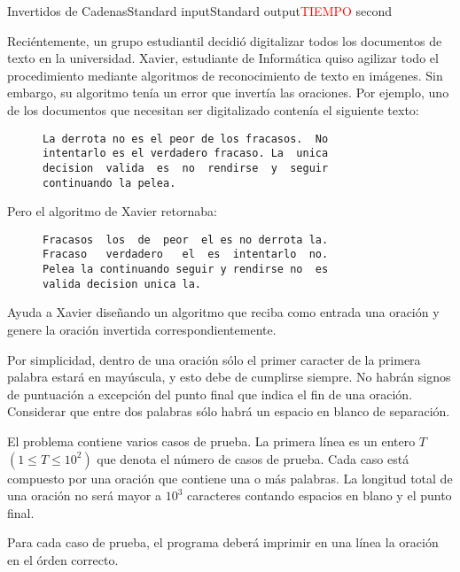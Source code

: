 \begin{problem}{Invertidos de Cadenas}{Standard input}{Standard output}{\textcolor{red}{TIEMPO} second}{}


Reciéntemente, un grupo estudiantil decidió digitalizar todos los documentos de texto en la universidad. Xavier, estudiante de Informática quiso agilizar todo el procedimiento mediante algoritmos de reconocimiento de texto en imágenes. Sin embargo, su algoritmo tenía un error que invertía las oraciones. Por ejemplo, uno de los documentos que necesitan ser digitalizado contenía el siguiente texto:

\begin{figure}[htb]
\centering
\begin{BVerbatim}
La derrota no es el peor de los fracasos.  No
intentarlo es el verdadero fracaso. La  unica 
decision  valida  es  no  rendirse  y  seguir
continuando la pelea.
\end{BVerbatim}
\end{figure}

Pero el algoritmo de Xavier retornaba:

\begin{figure}[htb]
\centering
\begin{BVerbatim}
Fracasos  los  de  peor  el es no derrota la.
Fracaso   verdadero   el  es  intentarlo  no.
Pelea la continuando seguir y rendirse no  es
valida decision unica la.
\end{BVerbatim}
\end{figure}

Ayuda a Xavier diseñando un algoritmo que reciba como entrada una oración y genere la oración invertida correspondientemente.

Por simplicidad, dentro de una oración sólo el primer caracter de la primera palabra estará en mayúscula, y esto debe de cumplirse siempre. No habrán signos de puntuación a excepción del punto final que indica el fin de una oración. Considerar que entre dos palabras sólo habrá un espacio en blanco de separación.


\InputFile
El problema contiene varios casos de prueba. La primera l\'inea es un entero $T$ $(1\leq T \leq 10^2)$ que denota el número de casos de prueba. Cada caso está compuesto por una oración que contiene una o más palabras. La longitud total de una oración no será mayor a $10^3$ caracteres contando espacios en blano y el punto final.

\OutputFile
Para cada caso de prueba, el programa deberá imprimir en una línea la oración en el órden correcto. 

\Example

\begin{example}
\end{example}

\end{problem}
